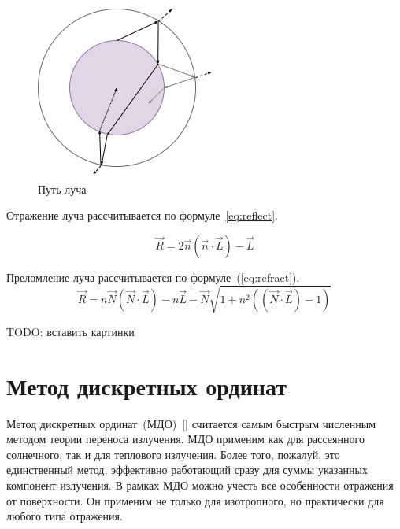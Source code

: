 \begin{figure}[H]
    \centering
    \includegraphics[width=0.5\linewidth]{img/rays}
    \caption{Путь луча}
    \label{fig:rays}
\end{figure}

Отражение луча рассчитывается по формуле~\ref{eq:reflect}.

\begin{equation}
\label{eq:reflect}
    \vec{R} = 2 \vec{n} (\vec{n}\cdot\vec{L}) - \vec{L}
\end{equation}

Преломление луча рассчитывается по формуле~(\ref{eq:refract}).
\begin{equation}
    \label{eq:refract}
    \vec{R} = n \vec{N} (\vec{N} \cdot \vec{L}) - n \vec{L} - \vec{N} \sqrt{1 + n^2((\vec{N} \cdot \vec{L}) - 1)}
\end{equation}

TODO: вставить картинки

\section{Метод дискретных ординат}

Метод дискретных ординат~(МДО)~[\cite{mdo}] считается самым быстрым численным методом теории переноса излучения. МДО применим как для рассеянного солнечного, так и для теплового излучения. Более того, пожалуй, это единственный метод, эффективно работающий сразу для суммы указанных компонент излучения. В рамках МДО можно учесть все особенности отражения от поверхности. Он применим не только для изотропного, но практически для любого типа отражения.  

